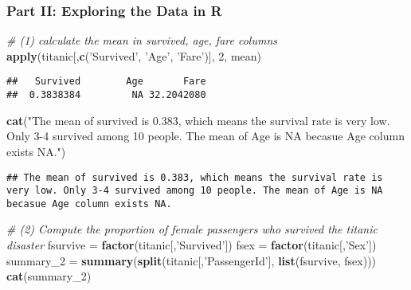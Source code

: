 \documentclass[]{article}
\newenvironment{Shaded}{\begin{snugshade}}{\end{snugshade}}
\newcommand{\KeywordTok}[1]{\textcolor[rgb]{0.13,0.29,0.53}{\textbf{#1}}}
\newcommand{\DecValTok}[1]{\textcolor[rgb]{0.00,0.00,0.81}{#1}}
\newcommand{\StringTok}[1]{\textcolor[rgb]{0.31,0.60,0.02}{#1}}
\newcommand{\CommentTok}[1]{\textcolor[rgb]{0.56,0.35,0.01}{\textit{#1}}}
\newcommand{\NormalTok}[1]{#1}
\begin{document}
\subsubsection{Part II: Exploring the Data in
R}\label{part-ii-exploring-the-data-in-r}

\begin{Shaded}
\begin{Highlighting}[]
\CommentTok{# (1) calculate the mean in survived, age, fare columns}
\KeywordTok{apply}\NormalTok{(titanic[,}\KeywordTok{c}\NormalTok{(}\StringTok{'Survived'}\NormalTok{, }\StringTok{'Age'}\NormalTok{, }\StringTok{'Fare'}\NormalTok{)], }\DecValTok{2}\NormalTok{, mean)}
\end{Highlighting}
\end{Shaded}

\begin{verbatim}
##   Survived        Age       Fare 
##  0.3838384         NA 32.2042080
\end{verbatim}

\begin{Shaded}
\begin{Highlighting}[]
\KeywordTok{cat}\NormalTok{(}\StringTok{"The mean of survived is 0.383, which means the survival rate is very low. Only 3-4 survived among 10 people. The mean of Age is NA becasue Age column exists NA."}\NormalTok{)}
\end{Highlighting}
\end{Shaded}

\begin{verbatim}
## The mean of survived is 0.383, which means the survival rate is very low. Only 3-4 survived among 10 people. The mean of Age is NA becasue Age column exists NA.
\end{verbatim}

\begin{Shaded}
\begin{Highlighting}[]
\CommentTok{# (2) Compute the proportion of female passengers who survived the titanic disaster}
\NormalTok{fsurvive =}\StringTok{ }\KeywordTok{factor}\NormalTok{(titanic[,}\StringTok{'Survived'}\NormalTok{])}
\NormalTok{fsex =}\StringTok{ }\KeywordTok{factor}\NormalTok{(titanic[,}\StringTok{'Sex'}\NormalTok{])}
\NormalTok{summary_}\DecValTok{2}\NormalTok{ =}\StringTok{ }\KeywordTok{summary}\NormalTok{(}\KeywordTok{split}\NormalTok{(titanic[,}\StringTok{'PassengerId'}\NormalTok{], }\KeywordTok{list}\NormalTok{(fsurvive, fsex)))}
\KeywordTok{cat}\NormalTok{(summary_}\DecValTok{2}\NormalTok{)}
\end{Highlighting}
\end{Shaded}
\end{document}
